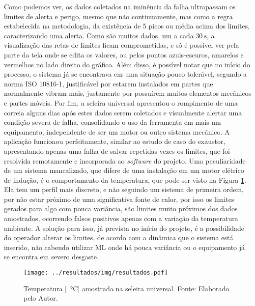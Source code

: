 \documentclass[a4paper]{ifacconf}
\begin{document}
Como podemos ver, os dados coletados na iminência da falha ultrapassam os limites de alerta e perigo, mesmo que não continuamente, mas
como a regra estabelecida na metodologia, da existência de 5 picos ou média acima dos limites, caracterizando uma alerta. Como são muitos dados,
um a cada $\SI{30}{\second}$, a visualização das retas de limites ficam comprometidas, e só é possível ver pela parte da tela onde se edita os
valores, ou pelos pontos azuis-escuros, amarelos e vermelhos no lado direito do gráfico. Além disso, é possível notar que no início do processo,
o sistema já se encontrava em uma situação pouco tolerável, segundo a norma ISO 10816-1, justificável por estarem instalados em partes que 
normalmente vibram mais, justamente por possuírem muitos elementos mecânicos e partes móveis. Por fim, a seleira universal apresentou o rompimento de uma
correia alguns dias após estes dados serem coletados e visualmente alertar uma condição severa de falha, consolidando o uso da ferramenta em
mais um equipamento, independente de ser um motor ou outro sistema mecânico. A aplicação funcionou perfeitamente, similar ao estudo de caso do
exaustor, apresentando apenas uma falha de salvar repetidas vezes os limites, que foi resolvida remotamente e incorporada ao \textit{software} do projeto.
Uma peculiaridade de um sistema mancalizado, que difere de uma instalação em um motor elétrico de indução, é o comportamento da temperatura,
que pode ser visto na Figura \ref{fig:seleira_universal_temperatura}. 
Ela tem um perfil mais discreto, e não seguindo um sistema de primeira ordem, por não estar próximo de uma significativa fonte de calor, por isso
os limites gerados para algo com pouca variância, são limites muito próximos dos dados amostrados, ocorrendo falsos positivos apenas com a
variação da temperatura ambiente. A solução para isso, já prevista no início do projeto, é a possibilidade do operador alterar os limites, de 
acordo com a dinâmica que o sistema está inserido, não cabendo utilizar  ML onde há pouca variância ou o equipamento já se 
encontra em severo desgaste. 


\begin{figure}[h!]
  \begin{center}
      \texttt{[image: ../resultados/img/resultados.pdf]}
  \end{center}
  \caption{Temperatura [\SI{}{\celsius}] amostrada na seleira universal. Fonte: Elaborado pelo Autor.}
  \label{fig:seleira_universal_temperatura}
\end{figure}
\end{document}
